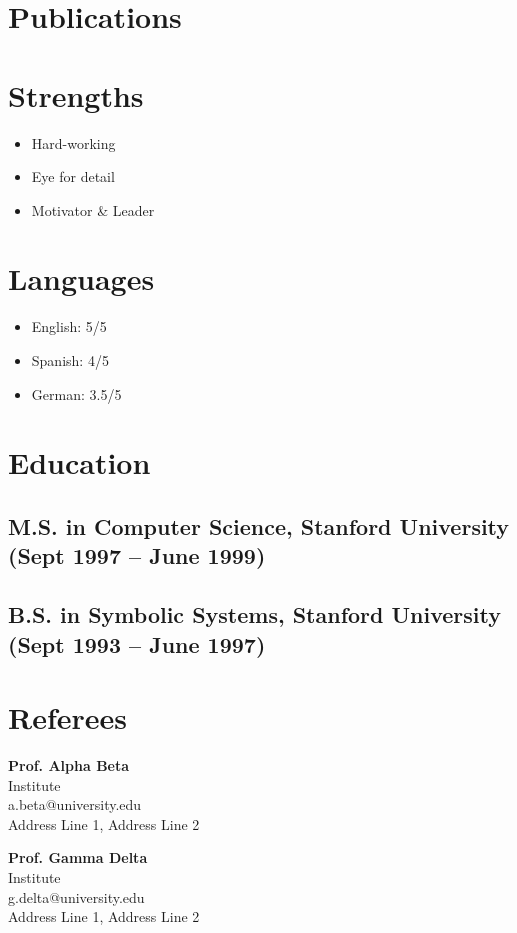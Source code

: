 \documentclass[10pt, a4paper]{article}
\begin{document}
\section*{\color{heading}Publications}

\section*{\color{heading}Strengths}
\begin{itemize}
    \item Hard-working
    \item Eye for detail
    \item Motivator \& Leader
\end{itemize}

\section*{\color{heading}Languages}
\begin{itemize}
    \item English: 5/5
    \item Spanish: 4/5
    \item German: 3.5/5
\end{itemize}

\section*{\color{heading}Education}
\subsection*{M.S. in Computer Science, Stanford University (Sept 1997 -- June 1999)}
\subsection*{B.S. in Symbolic Systems, Stanford University (Sept 1993 -- June 1997)}

\section*{\color{heading}Referees}
\textbf{Prof. Alpha Beta} \\
Institute \\
a.beta@university.edu \\
Address Line 1, Address Line 2

\textbf{Prof. Gamma Delta} \\
Institute \\
g.delta@university.edu \\
Address Line 1, Address Line 2
\end{document}
